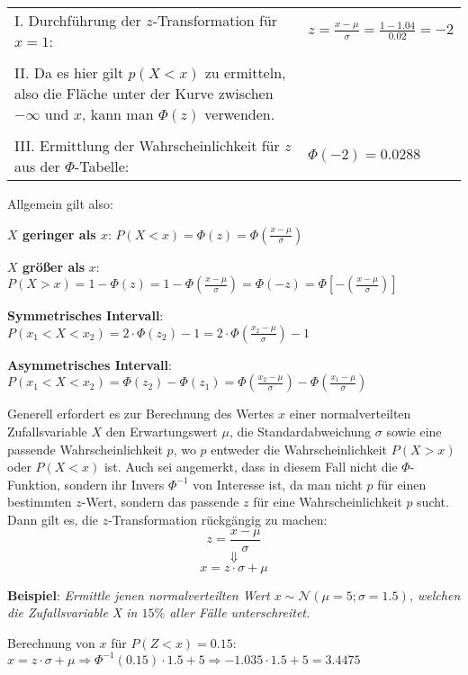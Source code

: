 \begin{table}[h!]
	\begin{tabular}{p{10cm} l}
	I. Durchf\"{u}hrung der $z$-Transformation f\"{u}r $x = 1$: & $z = \frac{x - \mu}{\sigma} = \frac{1 - 1.04}{0.02} = -2$
	\\ & \\
	II. Da es hier gilt $p(X < x)$ zu ermitteln, also die Fl\"{a}che unter der Kurve zwischen $-\infty$ und $x$, kann man $\Phi(z)$ verwenden. &
	\\ & \\
	III. Ermittlung der Wahrscheinlichkeit f\"{u}r $z$ aus der $\Phi$-Tabelle: & $\Phi(-2) = 0.0288$
	\end{tabular}
\end{table}

Allgemein gilt also: 

\textbf{$X$ geringer als $x$}: $P(X < x) = \Phi(z) = \Phi\left(\frac{x - \mu}{\sigma}\right)$

\textbf{$X$ gr\"{o}\ss{}er als} $x$: $P(X > x) = 1 - \Phi(z) = 1 - \Phi\left(\frac{x - \mu}{\sigma}\right) = \Phi(-z) = \Phi\left[-\left(\frac{x - \mu}{\sigma}\right)\right]$

\textbf{Symmetrisches Intervall}: $P(x_{1} < X < x_{2}) = 2 \cdot \Phi(z_{2}) - 1 = 2 \cdot \Phi\left(\frac{x_{2} - \mu}{\sigma}\right) - 1$

\textbf{Asymmetrisches Intervall}: $P(x_{1}< X < x_{2}) = \Phi(z_{2}) - \Phi(z_{1}) = \Phi\left(\frac{x_{2} - \mu}{\sigma}\right) - \Phi\left(\frac{x_{1} - \mu}{\sigma}\right)$


Generell erfordert es zur Berechnung des Wertes $x$ einer normalverteilten Zufallsvariable $X$ den Erwartungswert $\mu$, die Standardabweichung $\sigma$ sowie eine passende Wahrscheinlichkeit $p$, wo $p$ entweder die Wahrscheinlichkeit $P(X > x)$ oder $P(X < x)$ ist. Auch sei angemerkt, dass in diesem Fall nicht die $\Phi$-Funktion, sondern ihr Invers $\Phi^{-1}$ von Interesse ist, da man nicht $p$ f\"{u}r einen bestimmten $z$-Wert, sondern das passende $z$ f\"{u}r eine Wahrscheinlichkeit $p$ sucht. Dann gilt es, die $z$-Transformation r\"{u}ckg\"{a}ngig zu machen: $$z = \frac{x - \mu}{\sigma}$$ $$\Downarrow$$ $$x = z \cdot \sigma + \mu$$

\textbf{Beispiel}: \emph{Ermittle jenen normalverteilten Wert $x \sim \mathcal{N}(\mu = 5; \sigma = 1.5)$, welchen die Zufallsvariable X in $15\%$ aller F\"{a}lle unterschreitet.}

Berechnung von $x$ f\"{u}r $P(Z < x) = 0.15$: $x = z \cdot \sigma + \mu \Rightarrow \Phi^{-1}(0.15) \cdot 1.5 + 5 \Rightarrow -1.035 \cdot 1.5 + 5 = 3.4475$


